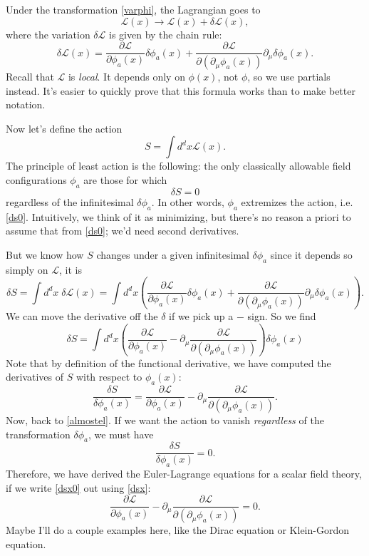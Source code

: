 \documentclass[main.tex]{subfiles}
\begin{document}
Under the transformation \ref{varphi}, the Lagrangian goes to 
\[
\mathcal{L}(x) \to \mathcal{L}(x) + \delta \mathcal{L}(x),
\]
where the variation $\delta \mathcal{L}$ is given by the chain rule:
\begin{equation} \label{varL}
\delta \mathcal{L} (x) = \frac{\partial \mathcal{L}}{\partial \phi_a (x)} \delta \phi_a (x) + \frac{\partial \mathcal{L}}{\partial (\partial_\mu \phi_a (x))} \partial_\mu \delta \phi_a (x).
\end{equation}
Recall that $\mathcal{L}$ is \textit{local}. It depends only on $\phi(x)$, not $\phi$, so we use partials instead. It's easier to quickly prove that this formula works than to make better notation.

Now let's define the action
\[
S = \int d^d x \mathcal{L} (x).
\]
The principle of least action is the following: the only classically allowable field configurations $\phi_a$ are those for which 
\begin{equation} \label{ds0}
\delta S = 0
\end{equation}
regardless of the infinitesimal $\delta \phi_a$. In other words, $\phi_a$ extremizes the action, i.e. \ref{ds0}. Intuitively, we think of it as minimizing, but there's no reason a priori to assume that from \ref{ds0}; we'd need second derivatives.

But we know how $S$ changes under a given infinitesimal $\delta \phi_a$ since it depends so simply on $\mathcal{L}$, it is
\[
\delta S = \int d^d x \; \delta \mathcal{L} (x) = \int d^d x \left( \frac{\partial \mathcal{L}}{\partial \phi_a (x)} \delta \phi_a (x) + \frac{\partial \mathcal{L}}{\partial (\partial_\mu \phi_a (x))} \partial_\mu \delta \phi_a (x) \right).
\]
We can move the derivative off the $\delta$ if we pick up a $-$ sign. So we find
\begin{equation} \label{almostel}
\delta S = \int d^d x \left(
\frac{\partial \mathcal{L}}{\partial \phi_a (x)} - \partial_\mu \frac{\partial \mathcal{L}}{\partial (\partial_\mu \phi_a (x))}
\right) \delta \phi_a (x)
\end{equation}
Note that by definition of the functional derivative, we have computed the derivatives of $S$ with respect to $\phi_a (x)$:
\begin{equation} \label{dsx}
\frac{\delta S}{\delta \phi_a (x)} =
\frac{\partial\mathcal{L}}{\partial \phi_a (x)} - \partial_\mu \frac{\partial \mathcal{L}}{\partial (\partial_\mu \phi_a (x))}.
\end{equation}
Now, back to \ref{almostel}. If we want the action to vanish \textit{regardless} of the transformation $\delta \phi_a$, we must have
\begin{equation} \label{dsx0}
\frac{\delta S}{\delta \phi_a (x)} = 0.
\end{equation}
Therefore, we have derived the Euler-Lagrange equations for a scalar field theory, if we write \ref{dsx0} out using \ref{dsx}:
\begin{equation} \label{elequation}
\frac{\partial\mathcal{L}}{\partial \phi_a (x)} - \partial_\mu \frac{\partial \mathcal{L}}{\partial (\partial_\mu \phi_a (x))} = 0.
\end{equation}
Maybe I'll do a couple examples here, like the Dirac equation or Klein-Gordon equation.
\end{document}
